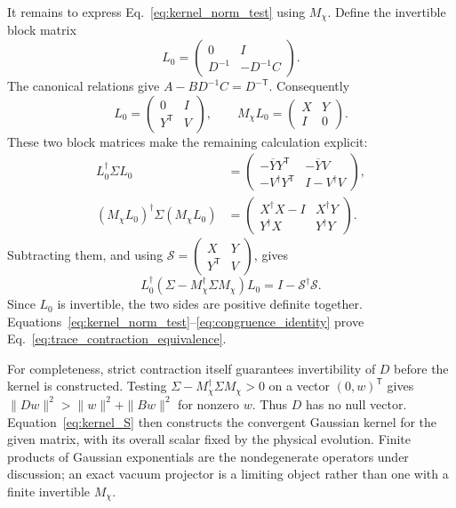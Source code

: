 \documentclass[11pt,a4paper]{article}
\newcommand{\trans}{\mathsf T}
\numberwithin{equation}{section}
\begin{document}
It remains to express Eq.~\eqref{eq:kernel_norm_test} using $M_\chi$.
Define the invertible block matrix
\begin{equation}
 L_0=\begin{pmatrix}0&I\\D^{-1}&-D^{-1}C\end{pmatrix}.
\end{equation}
The canonical relations give $A-BD^{-1}C=D^{-\trans}$. Consequently
\begin{equation}
 L_0=\begin{pmatrix}0&I\\Y^\trans&V\end{pmatrix},
 \qquad
 M_\chi L_0=\begin{pmatrix}X&Y\\I&0\end{pmatrix}.
\end{equation}
These two block matrices make the remaining calculation explicit:
\begin{align}
 L_0^\dagger\Sigma L_0
 &=\begin{pmatrix}
 -\overline Y Y^\trans&-\overline Y V\\
 -V^\dagger Y^\trans&I-V^\dagger V
 \end{pmatrix},\nonumber\\
 (M_\chi L_0)^\dagger\Sigma(M_\chi L_0)
 &=\begin{pmatrix}
 X^\dagger X-I&X^\dagger Y\\
 Y^\dagger X&Y^\dagger Y
 \end{pmatrix}.
\end{align}
Subtracting them, and using
$\mathcal S=\left(\begin{smallmatrix}X&Y\\Y^\trans&V\end{smallmatrix}\right)$,
gives
\begin{equation}
 L_0^\dagger(\Sigma-M_\chi^\dagger\Sigma M_\chi)L_0
 =I-\mathcal S^\dagger\mathcal S.
 \label{eq:congruence_identity}
\end{equation}
Since $L_0$ is invertible, the two sides are positive definite together.
Equations~\eqref{eq:kernel_norm_test}--\eqref{eq:congruence_identity}
prove Eq.~\eqref{eq:trace_contraction_equivalence}.

For completeness, strict contraction itself guarantees invertibility of
$D$ before the kernel is constructed. Testing
$\Sigma-M_\chi^\dagger\Sigma M_\chi>0$ on a vector $(0,w)^\trans$
gives $\|Dw\|^2>\|w\|^2+\|Bw\|^2$ for nonzero $w$. Thus $D$ has no
null vector. Equation~\eqref{eq:kernel_S} then constructs the convergent
Gaussian kernel for the given matrix, with its overall scalar fixed by the
physical evolution. Finite products of Gaussian exponentials are the
nondegenerate operators under discussion; an exact vacuum projector is a
limiting object rather than one with a finite invertible $M_\chi$.
\end{document}
